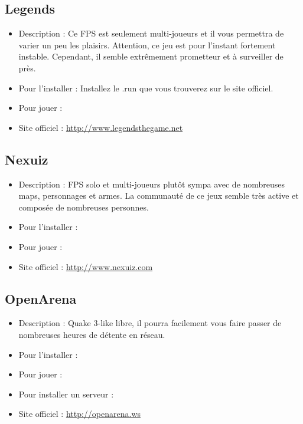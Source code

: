 \subsection{Legends}
\begin{itemize}
\begingroup
{}
\item Description : Ce FPS est seulement multi-joueurs et il vous permettra de varier un peu les plaisirs. Attention, ce jeu est pour l'instant fortement instable. Cependant, il semble extrêmement prometteur et à surveiller de près.{\par}
\endgroup
\item Pour l'installer : Installez le .run que vous trouverez sur le site officiel.{\par}
\item Pour jouer : 
\item Site officiel : \url{http://www.legendsthegame.net}{\par}
\end{itemize}
\subsection{Nexuiz}
\begin{itemize}
\begingroup
{}
\item Description : FPS solo et multi-joueurs plutôt sympa avec de nombreuses maps, personnages et armes. La communauté de ce jeux semble  très active et composée de nombreuses personnes.{\par}
\item Pour l'installer : 
\item Pour jouer : 
\item Site officiel : \url{http://www.nexuiz.com}{\par}
\endgroup
\end{itemize}
\subsection{OpenArena}
\begin{itemize}
\begingroup
{}
\item Description : Quake 3-like libre, il pourra facilement vous faire passer de nombreuses heures de détente en réseau.\par
\item Pour l'installer : 
\item Pour jouer : 
\item Pour installer un serveur : 
\item Site officiel : \url{http://openarena.ws}{\par}
\endgroup
\end{itemize}
